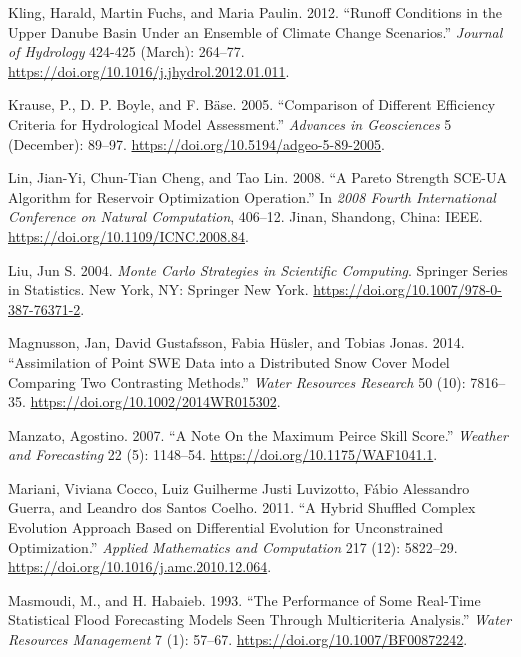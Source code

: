 \documentclass[
  letterpaper,
  DIV=11,
  numbers=noendperiod]{scrreprt}
\newlength{\cslhangindent}
\newlength{\cslentryspacingunit} %
\newenvironment{CSLReferences}[2] %
 {%
  \setlength{\parindent}{0pt}
  \ifodd #1
  \let\oldpar\par
  \def\par{\hangindent=\cslhangindent\oldpar}
  \fi
  \setlength{\parskip}{#2\cslentryspacingunit}
 }%
 {}
\begin{document}
\begin{CSLReferences}{1}{0}
\leavevmode{}%
Kling, Harald, Martin Fuchs, and Maria Paulin. 2012. {``Runoff
Conditions in the Upper {Danube} Basin Under an Ensemble of Climate
Change Scenarios.''} \emph{Journal of Hydrology} 424-425 (March):
264--77. \url{https://doi.org/10.1016/j.jhydrol.2012.01.011}.

\leavevmode{}%
Krause, P., D. P. Boyle, and F. Bäse. 2005. {``Comparison of Different
Efficiency Criteria for Hydrological Model Assessment.''} \emph{Advances
in Geosciences} 5 (December): 89--97.
\url{https://doi.org/10.5194/adgeo-5-89-2005}.

\leavevmode{}%
Lin, Jian-Yi, Chun-Tian Cheng, and Tao Lin. 2008. {``A {Pareto}
{Strength} {SCE}-{UA} {Algorithm} for {Reservoir} {Optimization}
{Operation}.''} In \emph{2008 {Fourth} {International} {Conference} on
{Natural} {Computation}}, 406--12. Jinan, Shandong, China: IEEE.
\url{https://doi.org/10.1109/ICNC.2008.84}.

\leavevmode{}%
Liu, Jun S. 2004. \emph{Monte {Carlo} {Strategies} in {Scientific}
{Computing}}. Springer {Series} in {Statistics}. New York, NY: Springer
New York. \url{https://doi.org/10.1007/978-0-387-76371-2}.

\leavevmode{}%
Magnusson, Jan, David Gustafsson, Fabia Hüsler, and Tobias Jonas. 2014.
{``Assimilation of Point {SWE} Data into a Distributed Snow Cover Model
Comparing Two Contrasting Methods.''} \emph{Water Resources Research} 50
(10): 7816--35. \url{https://doi.org/10.1002/2014WR015302}.

\leavevmode{}%
Manzato, Agostino. 2007. {``A {Note} {On} the {Maximum} {Peirce} {Skill}
{Score}.''} \emph{Weather and Forecasting} 22 (5): 1148--54.
\url{https://doi.org/10.1175/WAF1041.1}.

\leavevmode{}%
Mariani, Viviana Cocco, Luiz Guilherme Justi Luvizotto, Fábio Alessandro
Guerra, and Leandro dos Santos Coelho. 2011. {``A Hybrid Shuffled
Complex Evolution Approach Based on Differential Evolution for
Unconstrained Optimization.''} \emph{Applied Mathematics and
Computation} 217 (12): 5822--29.
\url{https://doi.org/10.1016/j.amc.2010.12.064}.

\leavevmode{}%
Masmoudi, M., and H. Habaieb. 1993. {``The Performance of Some Real-Time
Statistical Flood Forecasting Models Seen Through Multicriteria
Analysis.''} \emph{Water Resources Management} 7 (1): 57--67.
\url{https://doi.org/10.1007/BF00872242}.


\end{CSLReferences}
\end{document}

